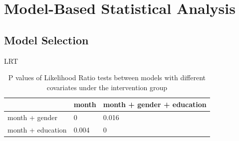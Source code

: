 \section{Model-Based Statistical Analysis} \label{sec:confirmatory}

\subsection{Model Selection}
LRT \cite{wu2009mixed}

\begin{table}[H]
\centering
\begin{tabular}{|l|l|l|}
\hline
& month & month + gender + education \\
\hline
month + gender & 0 & 0.016 \\
\hline
month + education & 0.004 & 0 \\
\hline
\end{tabular}
\caption{P values of Likelihood Ratio tests between models with different covariates under the intervention group}
\label{tab:model.comp.treatment.lrt}
\end{table}

